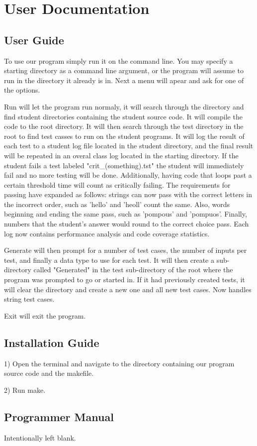 
\chapter{User Documentation}



\section{User Guide}

To use our program simply run it on the command line. You may specify a starting directory as a command
line argument, or the program will assume to run in the directory it already is in. Next a menu will apear
and ask for one of the options. 

Run will let the program run normaly, it will search through the directory
and find student directories containing the student source code. It will compile the code to the
root directory. It will then search through the test directory in the root to find test casses to run on the
student programs. It will log the result of each test to a student log file located in the student directory, and
the final result will be repeated in an overal class log located in the starting directory. If the student
fails a test labeled "crit\_(something).tst" the student will immediately fail and no more testing will be done.
Additionally, having code that loops past a certain threshold time will count as critically failing.
The requirements for passing have expanded as follows: strings can now pass with the correct letters in the
incorrect order, such as 'hello' and 'heoll' count the same. Also, words beginning and ending the same pass, 
such as 'pompous' and 'pompuos'. Finally, numbers that the student's answer would round to the correct choice pass.
Each log now contains performance analysis and code coverage statistics.

Generate will then prompt for a number of test cases, the number of inputs per test, and finally a data type
to use for each test. It will then create a sub-directory called "Generated" in the test sub-directory of the root
where the program was prompted to go or started in. If it had previously created tests, it will clear the directory
and create a new one and all new test cases. Now handles string test cases.

Exit will exit the program.


\section{Installation Guide}

1) Open the terminal and navigate to the directory containing our program source code and the makefile.

2) Run make.


\section{Programmer Manual}
Intentionally left blank.
